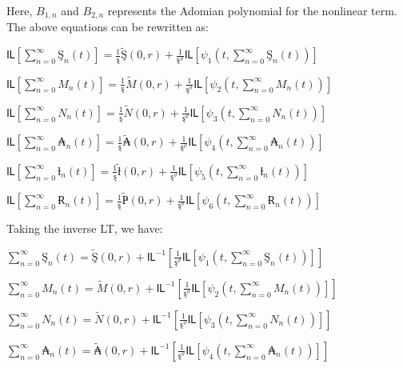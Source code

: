 \documentclass[10pt]{NSP1}
\begin{document}
Here, \(B_{1,n}\) and \(B_{2,n}\) represents the Adomian polynomial for the nonlinear term. The above equations can be rewritten as:

\(Ỻ\left\lbrack \sum_{n = 0}^{\infty}{}Ş_{n}(t) \right\rbrack = \frac{1}{ȿ}\widetilde{Ş}(0,r) + \frac{1}{ȿ^{\vartheta}}Ỻ\left\lbrack \psi_{1}\left( t,\sum_{n = 0}^{\infty}{}Ş_{n}(t) \right) \right\rbrack\)

\(Ỻ\left\lbrack \sum_{n = 0}^{\infty}{}M_{n}(t) \right\rbrack = \frac{1}{ȿ}\widetilde{M}(0,r) + \frac{1}{ȿ^{\vartheta}}Ỻ\left\lbrack \psi_{2}\left( t,\sum_{n = 0}^{\infty}{}M_{n}(t) \right) \right\rbrack\)

\(Ỻ\left\lbrack \sum_{n = 0}^{\infty}{}N_{n}(t) \right\rbrack = \frac{1}{ȿ}\widetilde{N}(0,r) + \frac{1}{ȿ^{\vartheta}}Ỻ\left\lbrack \psi_{3}\left( t,\sum_{n = 0}^{\infty}{}N_{n}(t) \right) \right\rbrack\)

\(Ỻ\left\lbrack \sum_{n = 0}^{\infty}{}₳_{n}(t) \right\rbrack = \frac{1}{ȿ}\widetilde{₳}(0,r) + \frac{1}{ȿ^{\vartheta}}Ỻ\left\lbrack \psi_{4}\left( t,\sum_{n = 0}^{\infty}{}₳_{n}(t) \right) \right\rbrack\)

\(Ỻ\left\lbrack \sum_{n = 0}^{\infty}{}ƚ_{n}(t) \right\rbrack = \frac{1}{ȿ}\widetilde{ƚ}(0,r) + \frac{1}{ȿ^{\vartheta}}Ỻ\left\lbrack \psi_{5}\left( t,\sum_{n = 0}^{\infty}{}ƚ_{n}(t) \right) \right\rbrack\)

\(Ỻ\left\lbrack \sum_{n = 0}^{\infty}{}Ɍ_{n}(t) \right\rbrack = \frac{1}{ȿ}\widetilde{Ҏ}(0,r) + \frac{1}{ȿ^{\vartheta}}Ỻ\left\lbrack \psi_{6}\left( t,\sum_{n = 0}^{\infty}{}Ɍ_{n}(t) \right) \right\rbrack\)

Taking the inverse LT, we have:

\(\sum_{n = 0}^{\infty}{}Ş_{n}(t) = \widetilde{Ş}(0,r) + Ỻ^{- 1}\left\lbrack \frac{1}{ȿ^{\vartheta}}Ỻ\left\lbrack \psi_{1}\left( t,\sum_{n = 0}^{\infty}{}Ş_{n}(t) \right) \right\rbrack \right\rbrack\)

\(\sum_{n = 0}^{\infty}{}M_{n}(t) = \widetilde{M}(0,r) + Ỻ^{- 1}\left\lbrack \frac{1}{ȿ^{\vartheta}}Ỻ\left\lbrack \psi_{2}\left( t,\sum_{n = 0}^{\infty}{}M_{n}(t) \right) \right\rbrack \right\rbrack\)

\(\sum_{n = 0}^{\infty}{}N_{n}(t) = \widetilde{N}(0,r) + Ỻ^{- 1}\left\lbrack \frac{1}{ȿ^{\vartheta}}Ỻ\left\lbrack \psi_{3}\left( t,\sum_{n = 0}^{\infty}{}N_{n}(t) \right) \right\rbrack \right\rbrack\)

\(\sum_{n = 0}^{\infty}{}₳_{n}(t) = \widetilde{₳}(0,r) + Ỻ^{- 1}\left\lbrack \frac{1}{ȿ^{\vartheta}}Ỻ\left\lbrack \psi_{4}\left( t,\sum_{n = 0}^{\infty}{}₳_{n}(t) \right) \right\rbrack \right\rbrack\)
\end{document}
